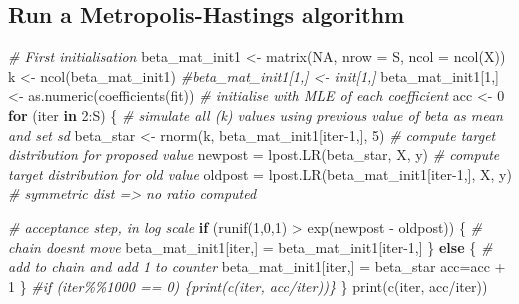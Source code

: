 \documentclass[
]{article}
\newenvironment{Shaded}{\begin{snugshade}}{\end{snugshade}}
\newcommand{\AttributeTok}[1]{\textcolor[rgb]{0.77,0.63,0.00}{#1}}
\newcommand{\CommentTok}[1]{\textcolor[rgb]{0.56,0.35,0.01}{\textit{#1}}}
\newcommand{\ConstantTok}[1]{\textcolor[rgb]{0.00,0.00,0.00}{#1}}
\newcommand{\ControlFlowTok}[1]{\textcolor[rgb]{0.13,0.29,0.53}{\textbf{#1}}}
\newcommand{\DecValTok}[1]{\textcolor[rgb]{0.00,0.00,0.81}{#1}}
\newcommand{\FunctionTok}[1]{\textcolor[rgb]{0.00,0.00,0.00}{#1}}
\newcommand{\NormalTok}[1]{#1}
\newcommand{\OtherTok}[1]{\textcolor[rgb]{0.56,0.35,0.01}{#1}}
\newcommand{\SpecialCharTok}[1]{\textcolor[rgb]{0.00,0.00,0.00}{#1}}
\begin{document}
\hypertarget{run-a-metropolis-hastings-algorithm}{%
\subsection{Run a Metropolis-Hastings
algorithm}\label{run-a-metropolis-hastings-algorithm}}

\begin{Shaded}
\begin{Highlighting}[]
\CommentTok{\# First initialisation}
\NormalTok{beta\_mat\_init1 }\OtherTok{\textless{}{-}} \FunctionTok{matrix}\NormalTok{(}\ConstantTok{NA}\NormalTok{, }\AttributeTok{nrow =}\NormalTok{ S, }\AttributeTok{ncol =} \FunctionTok{ncol}\NormalTok{(X))}
\NormalTok{k }\OtherTok{\textless{}{-}} \FunctionTok{ncol}\NormalTok{(beta\_mat\_init1)}
\CommentTok{\#beta\_mat\_init1[1,] \textless{}{-} init[1,]}
\NormalTok{beta\_mat\_init1[}\DecValTok{1}\NormalTok{,] }\OtherTok{\textless{}{-}} \FunctionTok{as.numeric}\NormalTok{(}\FunctionTok{coefficients}\NormalTok{(fit))  }\CommentTok{\# initialise with MLE of each coefficient}
\NormalTok{acc }\OtherTok{\textless{}{-}} \DecValTok{0}
\ControlFlowTok{for}\NormalTok{ (iter }\ControlFlowTok{in} \DecValTok{2}\SpecialCharTok{:}\NormalTok{S) \{}
  \CommentTok{\# simulate all (k) values using previous value of beta as mean and set sd}
\NormalTok{  beta\_star }\OtherTok{\textless{}{-}} \FunctionTok{rnorm}\NormalTok{(k, beta\_mat\_init1[iter}\DecValTok{{-}1}\NormalTok{,], }\DecValTok{5}\NormalTok{)}
  \CommentTok{\# compute target distribution for proposed value}
\NormalTok{  newpost }\OtherTok{=} \FunctionTok{lpost.LR}\NormalTok{(beta\_star, X, y)}
  \CommentTok{\# compute target distribution for old value}
\NormalTok{  oldpost }\OtherTok{=} \FunctionTok{lpost.LR}\NormalTok{(beta\_mat\_init1[iter}\DecValTok{{-}1}\NormalTok{,], X, y)  }\CommentTok{\# symmetric dist =\textgreater{} no ratio computed}
  
  \CommentTok{\# acceptance step, in log scale}
  \ControlFlowTok{if}\NormalTok{ (}\FunctionTok{runif}\NormalTok{(}\DecValTok{1}\NormalTok{,}\DecValTok{0}\NormalTok{,}\DecValTok{1}\NormalTok{) }\SpecialCharTok{\textgreater{}} \FunctionTok{exp}\NormalTok{(newpost }\SpecialCharTok{{-}}\NormalTok{ oldpost)) \{}
    \CommentTok{\# chain doesn\textquotesingle{}t move}
\NormalTok{    beta\_mat\_init1[iter,] }\OtherTok{=}\NormalTok{ beta\_mat\_init1[iter}\DecValTok{{-}1}\NormalTok{,]}
\NormalTok{  \} }\ControlFlowTok{else}\NormalTok{ \{}
    \CommentTok{\# add to chain and add 1 to counter}
\NormalTok{    beta\_mat\_init1[iter,] }\OtherTok{=}\NormalTok{ beta\_star}
\NormalTok{    acc}\OtherTok{=}\NormalTok{acc }\SpecialCharTok{+} \DecValTok{1}
\NormalTok{  \}}
  \CommentTok{\#if (iter\%\%1000 == 0) \{print(c(iter, acc/iter))\}}
\NormalTok{\}}
\FunctionTok{print}\NormalTok{(}\FunctionTok{c}\NormalTok{(iter, acc}\SpecialCharTok{/}\NormalTok{iter))}
\end{Highlighting}
\end{Shaded}
\end{document}

